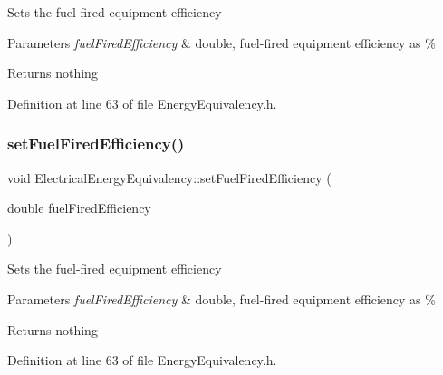 Sets the fuel-\/fired equipment efficiency


\begin{DoxyParams}{Parameters}
{\em fuel\+Fired\+Efficiency} & double, fuel-\/fired equipment efficiency as \%\\
\hline
\end{DoxyParams}
\begin{DoxyReturn}{Returns}
nothing 
\end{DoxyReturn}


Definition at line 63 of file Energy\+Equivalency.\+h.

\mbox{\label{class_electrical_energy_equivalency_ac73a4dadfeeff737a24b58e805ce9a3a}} 
\subsubsection{\texorpdfstring{set\+Fuel\+Fired\+Efficiency()}{setFuelFiredEfficiency()}\hspace{0.1cm}{\footnotesize\ttfamily [2/3]}}
{\footnotesize\ttfamily void Electrical\+Energy\+Equivalency\+::set\+Fuel\+Fired\+Efficiency (\begin{DoxyParamCaption}\item[{double}]{fuel\+Fired\+Efficiency }\end{DoxyParamCaption})\hspace{0.3cm}{\ttfamily [inline]}}

Sets the fuel-\/fired equipment efficiency


\begin{DoxyParams}{Parameters}
{\em fuel\+Fired\+Efficiency} & double, fuel-\/fired equipment efficiency as \%\\
\hline
\end{DoxyParams}
\begin{DoxyReturn}{Returns}
nothing 
\end{DoxyReturn}


Definition at line 63 of file Energy\+Equivalency.\+h.

\mbox{\label{class_electrical_energy_equivalency_ac73a4dadfeeff737a24b58e805ce9a3a}} 
